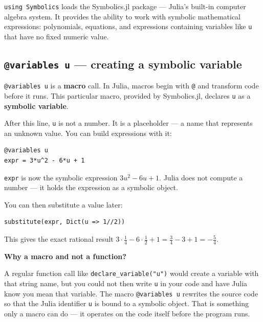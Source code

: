 \documentclass[12pt, a4paper]{article}
\newcommand{\cd}[1]{\texttt{#1}}
\begin{document}
\cd{using Symbolics} loads the Symbolics.jl package ---
Julia's built-in computer algebra system.
It provides the ability to work with symbolic mathematical
expressions: polynomials, equations, and expressions
containing variables like \cd{u} that have no fixed numeric value.

\subsection{\texttt{@variables u} --- creating a symbolic variable}

\cd{@variables u} is a \textbf{macro} call.
In Julia, macros begin with \cd{@} and transform code
before it runs.
This particular macro, provided by Symbolics.jl,
declares \cd{u} as a \textbf{symbolic variable}.

After this line, \cd{u} is not a number.
It is a placeholder --- a name that represents an unknown value.
You can build expressions with it:

\begin{examplebox}
\begin{verbatim}
@variables u
expr = 3*u^2 - 6*u + 1
\end{verbatim}

\cd{expr} is now the symbolic expression $3u^2 - 6u + 1$.
Julia does not compute a number --- it holds the expression
as a symbolic object.

You can then substitute a value later:
\begin{verbatim}
substitute(expr, Dict(u => 1//2))
\end{verbatim}
This gives the exact rational result $3 \cdot \tfrac{1}{4} - 6 \cdot \tfrac{1}{2} + 1 = \tfrac{3}{4} - 3 + 1 = -\tfrac{5}{4}$.
\end{examplebox}

\begin{notebox}
\textbf{Why a macro and not a function?}

A regular function call like \cd{declare\_variable("u")} would
create a variable with that string name, but you could not then
write \cd{u} in your code and have Julia know you mean that variable.
The macro \cd{@variables u} rewrites the source code so that
the Julia identifier \cd{u} is bound to a symbolic object.
That is something only a macro can do --- it operates on the
code itself before the program runs.
\end{notebox}


\end{document}
